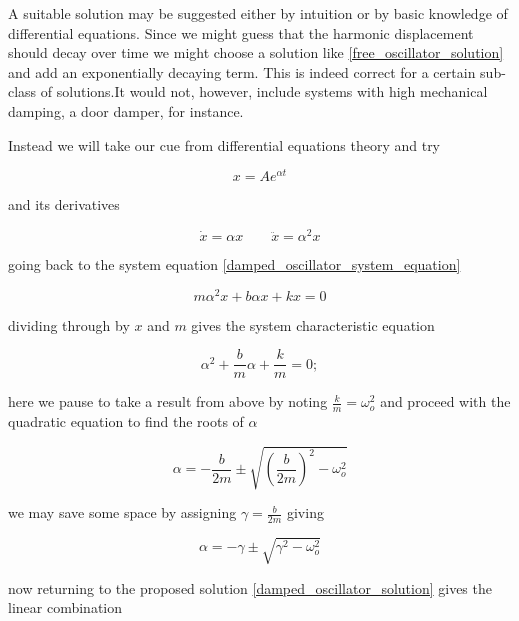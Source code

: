 \documentclass[11pt]{book}
\begin{document}
A suitable solution may be suggested either by intuition or by basic
knowledge of differential equations.  Since we might guess that the
harmonic displacement should decay over time we might choose a
solution like \eqref{free_oscillator_solution} and add an exponentially
decaying term. This is indeed correct for a certain sub-class of
solutions.It would not, however, include systems with high mechanical
damping, a door damper, for instance.


Instead we will take our cue from differential equations theory and try

\begin{equation}
  \label{damped_oscillator_solution}
  x = A e^{\alpha t}
\end{equation}

and its derivatives

\begin{equation*}
  \dot x = \alpha x \quad \quad  \ddot x = \alpha^2x
\end{equation*}

going back to the system equation \eqref{damped_oscillator_system_equation}

\begin{equation*}
  m \alpha^2 x + b \alpha x + k x = 0
\end{equation*}

dividing through by $x$ and $m$ gives the system characteristic
equation

\begin{equation*}
  \alpha^2 + \frac{b}{m} \alpha + \frac{k}{m} = 0;
\end{equation*}

here we pause to take a result from above by noting
$\frac{k}{m} = \omega_o^2$ and proceed with the quadratic equation to
find the roots of $\alpha$

\begin{equation}
  \label{oscillator_roots}
  \alpha = -\frac{b}{2m} \pm \sqrt{\left(\frac{b}{2m}\right)^2 - \omega_o^2}
\end{equation}

we may save some space by assigning $\gamma = \frac{b}{2m}$ giving

\begin{equation*}
  \alpha = -\gamma \pm \sqrt{\gamma^2 - \omega_o^2}
\end{equation*}

now returning to the proposed solution
\eqref{damped_oscillator_solution}
gives the linear combination
\end{document}
